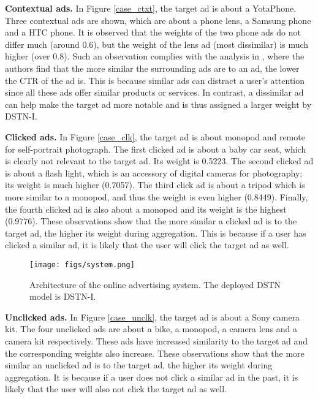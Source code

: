 \documentclass[sigconf]{acmart}
\begin{document}
\textbf{Contextual ads.} In Figure \ref{case_ctxt}, the target ad is about a YotaPhone. Three contextual ads are shown, which are about a phone lens, a Samsung phone and a HTC phone. It is observed that the weights of the two phone ads do not differ much (around 0.6), but the weight of the lens ad (most dissimilar) is much higher (over 0.8). Such an observation complies with the analysis in \cite{xiong2012relational}, where the authors find that the more similar the surrounding ads are to an ad, the lower the CTR of the ad is. This is because similar ads can distract a user's attention since all these ads offer similar products or services. In contrast, a dissimilar ad can help make the target ad more notable and is thus assigned a larger weight by DSTN-I.

\textbf{Clicked ads.} In Figure \ref{case_clk}, the target ad is about monopod and remote for self-portrait photograph. The first clicked ad is about a baby car seat, which is clearly not relevant to the target ad. Its weight is 0.5223. The second clicked ad is about a flash light, which is an accessory of digital cameras for photography; its weight is much higher (0.7057). The third click ad is about a tripod which is more similar to a monopod, and thus the weight is even higher (0.8449). Finally, the fourth clicked ad is also about a monopod and its weight is the highest (0.9776). These observations show that the more similar a clicked ad is to the target ad, the higher its weight during aggregation. This is because if a user has clicked a similar ad, it is likely that the user will click the target ad as well.

\begin{figure}[!t]
\centering
\texttt{[image: figs/system.png]}
\vskip -8pt
\caption{Architecture of the online advertising system. The deployed DSTN model is DSTN-I.}
\vskip -11pt
\label{server}
\end{figure}

\textbf{Unclicked ads.} In Figure \ref{case_unclk}, the target ad is about a Sony camera kit. The four unclicked ads are about a bike, a monopod, a camera lens and a camera kit respectively. These ads have increased similarity to the target ad and the corresponding weights also increase. These observations show that the more similar an unclicked ad is to the target ad, the higher its weight during aggregation. It is because if a user does not click a similar ad in the past, it is likely that the user will also not click the target ad as well.
\end{document}
